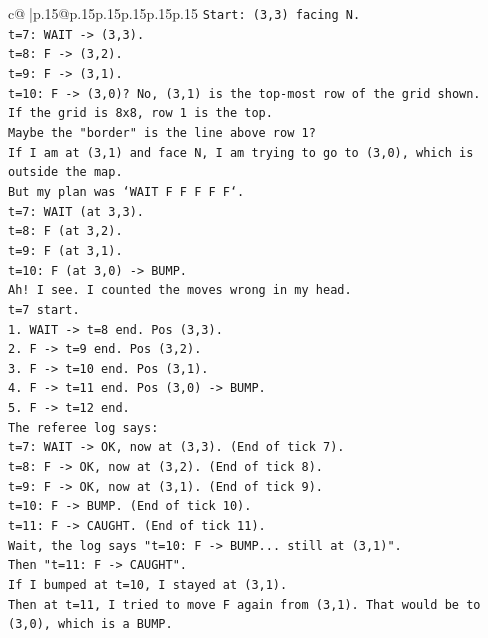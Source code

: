 \documentclass{article}
\begin{document}
{\begin{supertabular}{c@{$\;$}|p{.15\linewidth}@{}p{.15\linewidth}p{.15\linewidth}p{.15\linewidth}p{.15\linewidth}p{.15\linewidth}}
{{{\texttt{Start: (3,3) facing N.} \\
\texttt{t=7: WAIT {-}> (3,3).} \\
\texttt{t=8: F {-}> (3,2).} \\
\texttt{t=9: F {-}> (3,1).} \\
\texttt{t=10: F {-}> (3,0)? No, (3,1) is the top{-}most row of the grid shown.} \\
\texttt{If the grid is 8x8, row 1 is the top.} \\
\texttt{Maybe the "border" is the line above row 1?} \\
\texttt{If I am at (3,1) and face N, I am trying to go to (3,0), which is outside the map.} \\
\texttt{But my plan was `WAIT F F F F F`.} \\
\texttt{t=7: WAIT (at 3,3).} \\
\texttt{t=8: F (at 3,2).} \\
\texttt{t=9: F (at 3,1).} \\
\texttt{t=10: F (at 3,0) {-}> BUMP.} \\
\texttt{Ah! I see. I counted the moves wrong in my head.} \\
\texttt{t=7 start.} \\
\texttt{1. WAIT {-}> t=8 end. Pos (3,3).} \\
\texttt{2. F {-}> t=9 end. Pos (3,2).} \\
\texttt{3. F {-}> t=10 end. Pos (3,1).} \\
\texttt{4. F {-}> t=11 end. Pos (3,0) {-}> BUMP.} \\
\texttt{5. F {-}> t=12 end.} \\
\texttt{The referee log says:} \\
\texttt{t=7: WAIT {-}> OK, now at (3,3). (End of tick 7).} \\
\texttt{t=8: F {-}> OK, now at (3,2). (End of tick 8).} \\
\texttt{t=9: F {-}> OK, now at (3,1). (End of tick 9).} \\
\texttt{t=10: F {-}> BUMP. (End of tick 10).} \\
\texttt{t=11: F {-}> CAUGHT. (End of tick 11).} \\
\texttt{Wait, the log says "t=10: F {-}> BUMP... still at (3,1)".} \\
\texttt{Then "t=11: F {-}> CAUGHT".} \\
\texttt{If I bumped at t=10, I stayed at (3,1).} \\
\texttt{Then at t=11, I tried to move F again from (3,1). That would be to (3,0), which is a BUMP.} \\
}}}
\end{supertabular}}
\end{document}
